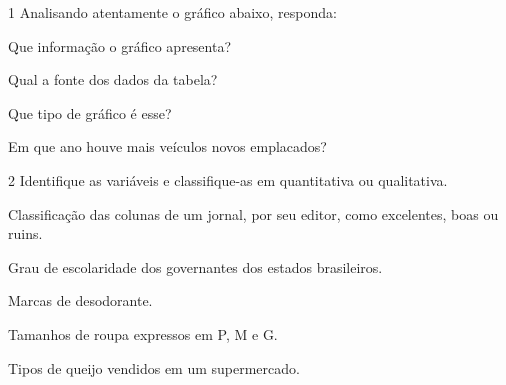 {

\num{1} Analisando atentamente o gráfico abaixo, responda:


\begin{escolha}
\item
  Que informação o gráfico apresenta?


\item
  Qual a fonte dos dados da tabela?


\item
  Que tipo de gráfico é esse?


\item
  Em que ano houve mais veículos novos emplacados?

\end{escolha}


\num{2} Identifique as variáveis e classifique-as em quantitativa 
ou qualitativa.

\begin{escolha}
\item
  Classificação das colunas de um jornal, por seu editor, como
  excelentes, boas ou ruins.


\item
  Grau de escolaridade dos governantes dos estados brasileiros.


\item
  Marcas de desodorante.


\item
  Tamanhos de roupa expressos em P, M e G.


\item
  Tipos de queijo vendidos em um supermercado.


\end{escolha}}
